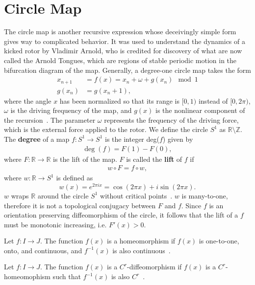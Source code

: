 \section{Circle Map}
The circle map is another
recursive expression whose deceivingly simple form gives way to complicated behavior. It was used to
understand the dynamics of a kicked rotor by Vladimir
Arnold, who is credited for discovery of what are now called the Arnold Tongues, which are
regions of stable periodic motion in the bifurcation diagram of the
map. Generally, a degree-one circle map takes the form
\begin{align*}
x_{n+1}&=f(x)=x_n + \omega + g(x_n) \mod 1\\
g(x_n)&=g(x_n + 1),
\end{align*}
where the angle $x$ has been normalized so that its range is $[0,1)$
instead of $[0,2\pi )$, $\omega$ is the driving frequency of the map, and
$g(x)$ is the nonlinear component of the recursion~\cite{rasband}. The
parameter $\omega$ represents the frequency of the driving
force, which is the external force applied to the
rotor. We define the circle $S^1$ as $\mathbb{R} \setminus
\mathbb{Z}$. The \textbf{degree} of a map $f:S^1 \to S^1$ is the integer
deg($f$) given by 
\begin{align*}
\deg(f) = F(1) - F(0),
\end{align*}
where $F:\mathbb{R} \to \mathbb{R}$ is the lift of the
map. $F$ is called the \textbf{lift} of $f$ if
\begin{align*}
w \circ F = f \circ w,
\end{align*}
where $w:\mathbb{R} \to S^1$ is defined as
\begin{equation*}
w(x) = e^{2\pi i x} = \cos(2\pi x) + i\sin(2\pi x).
\end{equation*}
$w$ wraps $\mathbb{R}$ around the circle $S^1$ without critical
points~\cite{devaney}. $w$ is many-to-one, therefore it is not a topological conjugacy
between $F$ and $f$. Since $f$ is an orientation
preserving diffeomorphism of the circle, it follows that the lift of a $f$ must be
monotonic increasing, i.e. $F'(x)>0$.

\begin{singlespacing}
\begin{definition}
Let $f:I \to J$. The function $f(x)$ is a homeomorphism if $f(x)$ is
one-to-one, onto, and continuous, and $f^{-1}(x)$ is also continuous~\cite{devaney}.
\end{definition}
\begin{definition}
Let $f:I\to J$. The function $f(x)$ is a $C^r$-diffeomorphism if
$f(x)$ is a $C^r$-homeomophism such that $f^{-1}(x)$ is also $C^r$~\cite{devaney}. 
\end{definition}
\end{singlespacing}

